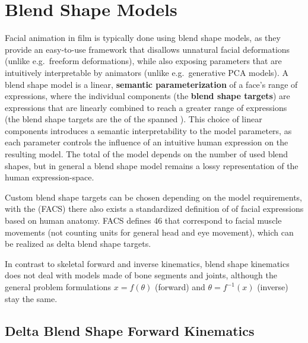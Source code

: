 \chapter{Blend Shape Models}
\label{chap:blendshapemodels}

Facial animation in film is typically done using blend shape models,
as they provide an easy-to-use framework that disallows unnatural facial deformations (unlike e.g.\ freeform deformations),
while also exposing parameters that are intuitively interpretable by animators (unlike e.g.\ generative PCA models).
A blend shape model is a linear, \textbf{semantic parameterization} of a face's range of expressions,
where the individual components (the \textbf{blend shape targets}) are  expressions that are linearly combined to reach a greater range of  expressions (the blend shape targets are the  of the spanned ).
This choice of linear components introduces a semantic interpretability to the model parameters,
as each parameter controls the influence of an intuitive human expression on the resulting model.
The total  of the model depends on the number of used blend shapes,
but in general a blend shape model remains a lossy representation of the human expression-space.

Custom blend shape targets can be chosen depending on the model requirements,
with the  (FACS) there also exists a standardized definition of  of facial expressions based on human anatomy.
FACS defines 46  that correspond to facial muscle movements (not counting units for general head and eye movement),
which can be realized as delta blend shape targets.

In contrast to skeletal forward and inverse kinematics,
blend shape kinematics does not deal with models made of bone segments and joints,
although the general problem formulations \(x=f(\theta)\) (forward) and \(\theta=f^{-1}(x)\) (inverse) stay the same.

\section{Delta Blend Shape Forward Kinematics}
\label{sec:blendshapeforwardkinematics}

